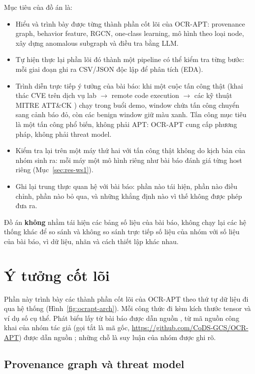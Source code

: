 Mục tiêu của đồ án là:
\begin{itemize}
    \item Hiểu và trình bày được từng thành phần cốt lõi của OCR-APT: provenance graph, behavior feature, RGCN, one-class learning, mô hình theo loại node, xây dựng anomalous subgraph và điều tra bằng LLM.
    \item Tự hiện thực lại phần lõi đó thành một pipeline có thể kiểm tra từng bước: mỗi giai đoạn ghi ra CSV/JSON độc lập để phân tích (EDA).
    \item Trình diễn trực tiếp ý tưởng của bài báo: khi một cuộc tấn công thật (khai thác CVE trên dịch vụ lab $\rightarrow$ remote code execution $\rightarrow$ các kỹ thuật MITRE ATT\&CK \cite{mitre_attack}) chạy trong buổi demo, window chứa tấn công chuyển sang cảnh báo đỏ, còn các benign window giữ màu xanh. Tấn công mục tiêu là một tấn công phổ biến, không phải APT: OCR-APT cung cấp phương pháp, không phải threat model.
    \item Kiểm tra lại trên một máy thứ hai với tấn công thật không do kịch bản của nhóm sinh ra: mỗi máy một mô hình riêng như bài báo đánh giá từng host riêng (Mục~\ref{sec:res-ws1}).
    \item Ghi lại trung thực quan hệ với bài báo: phần nào tái hiện, phần nào điều chỉnh, phần nào bỏ qua, và những khẳng định nào vì thế không được phép đưa ra.
\end{itemize}

Đồ án \textbf{không} nhằm tái hiện các bảng số liệu của bài báo, không chạy lại các hệ thống khác để so sánh và không so sánh trực tiếp số liệu của nhóm với số liệu của bài báo, vì dữ liệu, nhãn và cách thiết lập khác nhau.

\section{Ý tưởng cốt lõi}
\label{sec:theory}

Phần này trình bày các thành phần cốt lõi của OCR-APT theo thứ tự dữ liệu đi qua hệ thống (Hình~\ref{fig:ocrapt-arch}). Mỗi công thức đi kèm kích thước tensor và ví dụ số cụ thể. Phát biểu lấy từ bài báo được dẫn nguồn \cite{aly2025ocrapt}, từ mã nguồn công khai của nhóm tác giả (gọi tắt là mã gốc, \url{https://github.com/CoDS-GCS/OCR-APT}) được dẫn nguồn \cite{ocrapt_repo}; những chỗ là suy luận của nhóm được ghi rõ.

\subsection{Provenance graph và threat model}
\label{sec:theory-pg}

